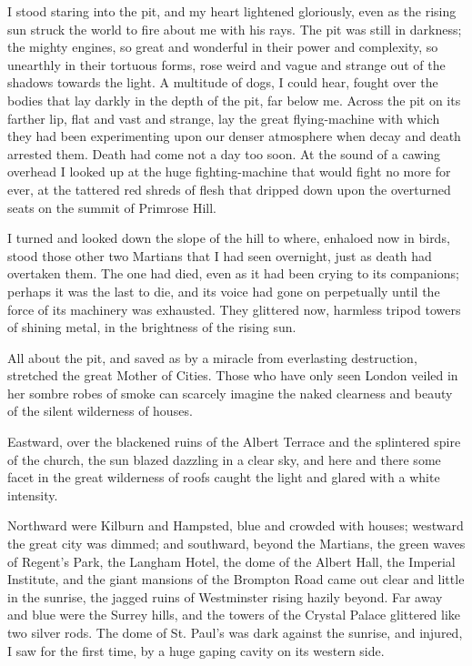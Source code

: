 I stood staring into the pit, and my heart lightened gloriously,
even as the rising sun struck the world to fire about me with his
rays. The pit was still in darkness; the mighty engines, so great
and wonderful in their power and complexity, so unearthly in their
tortuous forms, rose weird and vague and strange out of the shadows
towards the light. A multitude of dogs, I could hear, fought over
the bodies that lay darkly in the depth of the pit, far below me.
Across the pit on its farther lip, flat and vast and strange, lay
the great flying-machine with which they had been experimenting
upon our denser atmosphere when decay and death arrested them.
Death had come not a day too soon. At the sound of a cawing
overhead I looked up at the huge fighting-machine that would fight
no more for ever, at the tattered red shreds of flesh that dripped
down upon the overturned seats on the summit of Primrose Hill.

I turned and looked down the slope of the hill to where, enhaloed
now in birds, stood those other two Martians that I had seen
overnight, just as death had overtaken them. The one had died, even
as it had been crying to its companions; perhaps it was the last to
die, and its voice had gone on perpetually until the force of its
machinery was exhausted. They glittered now, harmless tripod towers
of shining metal, in the brightness of the rising sun.

All about the pit, and saved as by a miracle from everlasting
destruction, stretched the great Mother of Cities. Those who have
only seen London veiled in her sombre robes of smoke can scarcely
imagine the naked clearness and beauty of the silent wilderness of
houses.

Eastward, over the blackened ruins of the Albert Terrace and the
splintered spire of the church, the sun blazed dazzling in a clear
sky, and here and there some facet in the great wilderness of roofs
caught the light and glared with a white intensity.

Northward were Kilburn and Hampsted, blue and crowded with houses;
westward the great city was dimmed; and southward, beyond the
Martians, the green waves of Regent's Park, the Langham Hotel, the
dome of the Albert Hall, the Imperial Institute, and the giant
mansions of the Brompton Road came out clear and little in the
sunrise, the jagged ruins of Westminster rising hazily beyond. Far
away and blue were the Surrey hills, and the towers of the Crystal
Palace glittered like two silver rods. The dome of St. Paul's was
dark against the sunrise, and injured, I saw for the first time, by
a huge gaping cavity on its western side.

